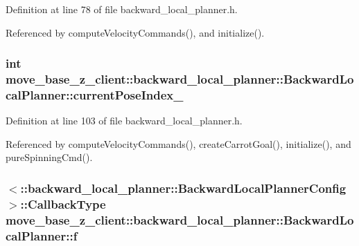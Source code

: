 Definition at line 78 of file backward\+\_\+local\+\_\+planner.\+h.



Referenced by compute\+Velocity\+Commands(), and initialize().

\subsubsection[{\texorpdfstring{current\+Pose\+Index\+\_\+}{currentPoseIndex_}}]{\setlength{\rightskip}{0pt plus 5cm}int move\+\_\+base\+\_\+z\+\_\+client\+::backward\+\_\+local\+\_\+planner\+::\+Backward\+Local\+Planner\+::current\+Pose\+Index\+\_\+\hspace{0.3cm}{\ttfamily [private]}}\hypertarget{classmove__base__z__client_1_1backward__local__planner_1_1BackwardLocalPlanner_af304b2e7cde744ad905a1ae7889102b6}{}\label{classmove__base__z__client_1_1backward__local__planner_1_1BackwardLocalPlanner_af304b2e7cde744ad905a1ae7889102b6}


Definition at line 103 of file backward\+\_\+local\+\_\+planner.\+h.



Referenced by compute\+Velocity\+Commands(), create\+Carrot\+Goal(), initialize(), and pure\+Spinning\+Cmd().

\subsubsection[{\texorpdfstring{f}{f}}]{$<$\+::backward\+\_\+local\+\_\+planner\+::\+Backward\+Local\+Planner\+Config$>$\+::Callback\+Type move\+\_\+base\+\_\+z\+\_\+client\+::backward\+\_\+local\+\_\+planner\+::\+Backward\+Local\+Planner\+::f\hspace{0.3cm}{\ttfamily [private]}}\hypertarget{classmove__base__z__client_1_1backward__local__planner_1_1BackwardLocalPlanner_a8851653bff38ab410bda8aca0ba32574}{}\label{classmove__base__z__client_1_1backward__local__planner_1_1BackwardLocalPlanner_a8851653bff38ab410bda8aca0ba32574}


